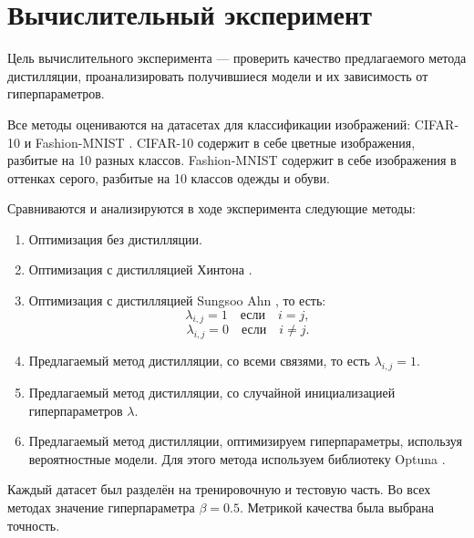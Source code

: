 \section{Вычислительный эксперимент}

Цель вычислительного эксперимента --- проверить качество предлагаемого метода дистилляции,
проанализировать получившиеся модели и их зависимость от гиперпараметров.

Все методы оцениваются на датасетах для классификации изображений: CIFAR-10 \cite{Krizhevsky2009LearningML}  и Fashion-MNIST \cite{xiao2017fashion}.
CIFAR-10 содержит в себе цветные изображения, разбитые на 10 разных классов.
Fashion-MNIST содержит в себе изображения в оттенках серого, разбитые на 10 классов одежды и обуви.

Сравниваются и анализируются в ходе эксперимента следующие методы:

\begin{enumerate}
    \item Оптимизация без дистилляции.
    \item Оптимизация с дистилляцией Хинтона \cite{hinton2015distilling}.
    \item Оптимизация с дистилляцией Sungsoo Ahn \cite{Ahn_2019_CVPR}, то есть:
          $$\lambda_{i,j} = 1 \quad \text{если} \quad i = j,$$
          $$\lambda_{i,j} = 0 \quad \text{если} \quad i \neq j.$$
    \item Предлагаемый метод дистилляции, со всеми связями, то есть $\lambda_{i,j} = 1$.
    \item Предлагаемый метод дистилляции, со случайной инициализацией гиперпараметров $\lambda$.
    \item Предлагаемый метод дистилляции, оптимизируем гиперпараметры, используя вероятностные модели. Для этого метода используем библиотеку Optuna \cite{optuna_2019}.
\end{enumerate}

Каждый датасет был разделён на тренировочную и тестовую часть. Во всех методах значение гиперпараметра $\beta = 0.5$.
Метрикой качества была выбрана точность.

